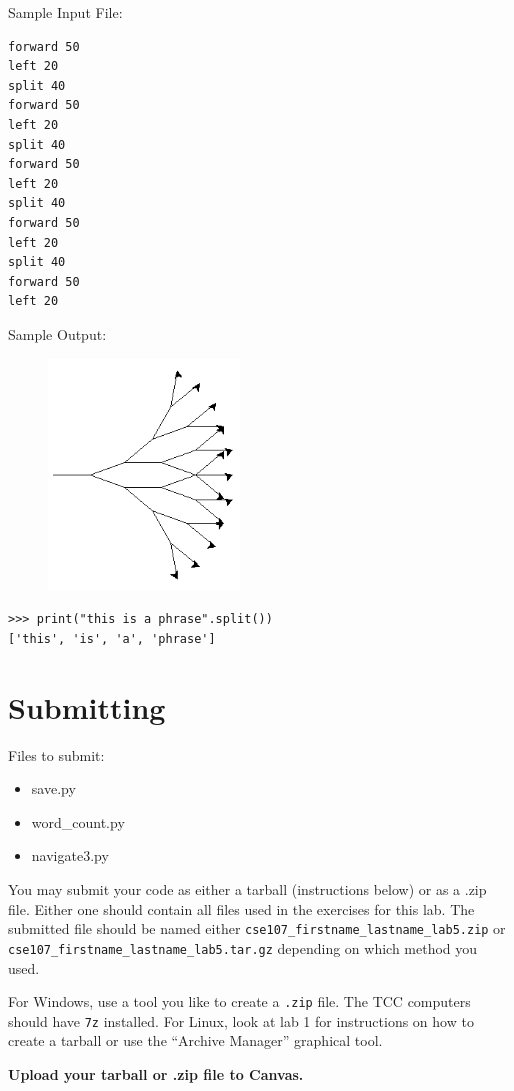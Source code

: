 \documentclass[11pt]{cselabheader}
\begin{document}
\begin{description}
  Sample Input File:
  \begin{lstlisting}[style=python]
forward 50
left 20
split 40
forward 50
left 20
split 40
forward 50
left 20
split 40
forward 50
left 20
split 40
forward 50
left 20
  \end{lstlisting}

  Sample Output:
  \begin{figure}[h]
    \centering
    \includegraphics[width=2.0in]{img/nav3_example}
  \end{figure}


  \begin{lstlisting}[style=ipython]
>>> print("this is a phrase".split())
['this', 'is', 'a', 'phrase']
  \end{lstlisting}

\end{description}

\section{Submitting}

Files to submit:
\begin{itemize}
\item save.py
\item word\_count.py
\item navigate3.py
\end{itemize}

You may submit your code as either a tarball (instructions below) or as a .zip
file. Either one should contain all files used in the exercises for this lab.
The submitted file should be named either
\texttt{cse107\_firstname\_lastname\_lab5.zip} or
\texttt{cse107\_firstname\_lastname\_lab5.tar.gz} depending on which method you
used.

For Windows, use a tool you like to create a \texttt{.zip} file. The TCC
computers should have \texttt{7z} installed. For Linux, look at lab 1 for
instructions on how to create a tarball or use the ``Archive Manager'' graphical
tool.

\begin{center}
  \textbf{Upload your tarball or .zip file to Canvas.}
\end{center}
\end{document}
